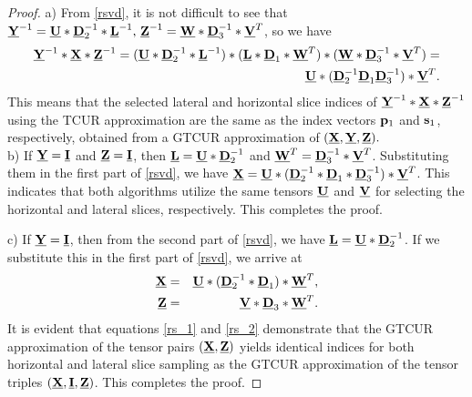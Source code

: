 \documentclass[preprint,12pt]{elsarticle}
\theoremstyle{definition}
\newcommand{\cX}{\underline{\bf X}}
\newcommand{\cY}{\underline{\bf Y}}
\newcommand{\cU}{\underline{\bf U}}
\newcommand{\cV}{\underline{\bf V}}
\newcommand{\cZ}{\underline{\bf Z}}
\newcommand{\cW}{\underline{\bf W}}
\newcommand{\cD}{\underline{\bf D}}
\newcommand{\cL}{\underline{\bf L}}
\newcommand{\I}{{\bf I}}
\begin{document}
\begin{proof}
a) From \ref{rsvd}, it is not difficult to see that $\cY^{-1}=\cU*{\cD}_2^{-1}*\cL^{-1},\,\cZ^{-1}=\cW*\cD_3^{-1}*\cV^T$, so we have 
\begin{eqnarray}
\nonumber
\cY^{-1}*\cX*\cZ^{-1}=(\cU*{\cD}_2^{-1}*\cL^{-1})*(\cL*\cD_1*\cW^T)*(\cW*\cD_3^{-1}*\cV^T)=\\\label{prf}
\cU*(\cD_2^{-1}\cD_1\cD_3^{-1})*\cV^T.
\end{eqnarray}
This means that the selected lateral and horizontal slice indices of $\cY^{-1}*\cX*\cZ^{-1}$ using the TCUR approximation are the same as the index vectors ${\bf p}_1$ and ${\bf s}_1$, respectively, obtained from a GTCUR approximation of $(\cX,\cY,\cZ).$\\

b) If $\cY=\underline{\I}$ and $\cZ=\underline{\I}$, then $\cL=\cU*{\cD}_2^{-1}$ and $\cW^T=\cD_3^{-1}*\cV^T$. Substituting them in the first part of \eqref{rsvd}, we have $\cX=\cU*(\cD_2^{-1}*\cD_1*\cD_3^{-1})*\cV^T$. This indicates that both algorithms utilize the same tensors $\cU$ and $\cV$  for selecting the horizontal and lateral slices, respectively. This completes the proof.


c) If $\cY=\underline{\I}$, then from the second part of \eqref{rsvd}, we have $\cL=\cU*\cD_2^{-1}$. If we substitute this in the first part of \eqref{rsvd}, we arrive at 
\begin{eqnarray}\label{rs_1}
\cX&=&\cU*(\cD_2^{-1}*\cD_1)*\cW^T,\\\label{rs_2}
\cZ&=&\cV*\cD_3*\cW^T.  
\end{eqnarray}
It is evident that equations \eqref{rs_1} and \eqref{rs_2} demonstrate that the GTCUR approximation of the tensor pairs $(\cX,\cZ)$ yields identical indices for both horizontal and lateral slice sampling as the GTCUR approximation of the tensor triples $(\cX,\underline{\bf I},\cZ)$. This completes the proof.

\end{proof}
\end{document}
